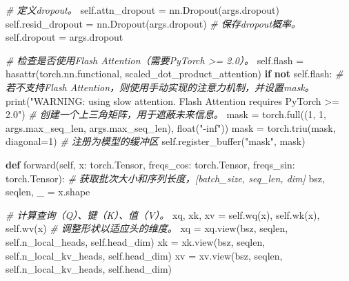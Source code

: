 \documentclass[
]{article}
\newenvironment{Shaded}{}{}
\newcommand{\BuiltInTok}[1]{\textcolor[rgb]{0.00,0.50,0.00}{#1}}
\newcommand{\CommentTok}[1]{\textcolor[rgb]{0.38,0.63,0.69}{\textit{#1}}}
\newcommand{\ControlFlowTok}[1]{\textcolor[rgb]{0.00,0.44,0.13}{\textbf{#1}}}
\newcommand{\DecValTok}[1]{\textcolor[rgb]{0.25,0.63,0.44}{#1}}
\newcommand{\KeywordTok}[1]{\textcolor[rgb]{0.00,0.44,0.13}{\textbf{#1}}}
\newcommand{\NormalTok}[1]{#1}
\newcommand{\OperatorTok}[1]{\textcolor[rgb]{0.40,0.40,0.40}{#1}}
\newcommand{\StringTok}[1]{\textcolor[rgb]{0.25,0.44,0.63}{#1}}
\newcommand{\VariableTok}[1]{\textcolor[rgb]{0.10,0.09,0.49}{#1}}
\begin{document}
\begin{Shaded}
\begin{Highlighting}[]
        \CommentTok{\# 定义dropout。}
        \VariableTok{self}\NormalTok{.attn\_dropout }\OperatorTok{=}\NormalTok{ nn.Dropout(args.dropout)}
        \VariableTok{self}\NormalTok{.resid\_dropout }\OperatorTok{=}\NormalTok{ nn.Dropout(args.dropout)}
        \CommentTok{\# 保存dropout概率。}
        \VariableTok{self}\NormalTok{.dropout }\OperatorTok{=}\NormalTok{ args.dropout}

        \CommentTok{\# 检查是否使用Flash Attention（需要PyTorch \textgreater{}= 2.0）。}
        \VariableTok{self}\NormalTok{.flash }\OperatorTok{=} \BuiltInTok{hasattr}\NormalTok{(torch.nn.functional, }\StringTok{\textquotesingle{}scaled\_dot\_product\_attention\textquotesingle{}}\NormalTok{)}
        \ControlFlowTok{if} \KeywordTok{not} \VariableTok{self}\NormalTok{.flash:}
            \CommentTok{\# 若不支持Flash Attention，则使用手动实现的注意力机制，并设置mask。}
            \BuiltInTok{print}\NormalTok{(}\StringTok{"WARNING: using slow attention. Flash Attention requires PyTorch \textgreater{}= 2.0"}\NormalTok{)}
            \CommentTok{\# 创建一个上三角矩阵，用于遮蔽未来信息。}
\NormalTok{            mask }\OperatorTok{=}\NormalTok{ torch.full((}\DecValTok{1}\NormalTok{, }\DecValTok{1}\NormalTok{, args.max\_seq\_len, args.max\_seq\_len), }\BuiltInTok{float}\NormalTok{(}\StringTok{"{-}inf"}\NormalTok{))}
\NormalTok{            mask }\OperatorTok{=}\NormalTok{ torch.triu(mask, diagonal}\OperatorTok{=}\DecValTok{1}\NormalTok{)}
            \CommentTok{\# 注册为模型的缓冲区}
            \VariableTok{self}\NormalTok{.register\_buffer(}\StringTok{"mask"}\NormalTok{, mask)}

    \KeywordTok{def}\NormalTok{ forward(}\VariableTok{self}\NormalTok{, x: torch.Tensor, freqs\_cos: torch.Tensor, freqs\_sin: torch.Tensor):}
        \CommentTok{\# 获取批次大小和序列长度，[batch\_size, seq\_len, dim]}
\NormalTok{        bsz, seqlen, \_ }\OperatorTok{=}\NormalTok{ x.shape}

        \CommentTok{\# 计算查询（Q）、键（K）、值（V）。}
\NormalTok{        xq, xk, xv }\OperatorTok{=} \VariableTok{self}\NormalTok{.wq(x), }\VariableTok{self}\NormalTok{.wk(x), }\VariableTok{self}\NormalTok{.wv(x)}
        \CommentTok{\# 调整形状以适应头的维度。}
\NormalTok{        xq }\OperatorTok{=}\NormalTok{ xq.view(bsz, seqlen, }\VariableTok{self}\NormalTok{.n\_local\_heads, }\VariableTok{self}\NormalTok{.head\_dim)}
\NormalTok{        xk }\OperatorTok{=}\NormalTok{ xk.view(bsz, seqlen, }\VariableTok{self}\NormalTok{.n\_local\_kv\_heads, }\VariableTok{self}\NormalTok{.head\_dim)}
\NormalTok{        xv }\OperatorTok{=}\NormalTok{ xv.view(bsz, seqlen, }\VariableTok{self}\NormalTok{.n\_local\_kv\_heads, }\VariableTok{self}\NormalTok{.head\_dim)}


\end{Highlighting}
\end{Shaded}
\end{document}
